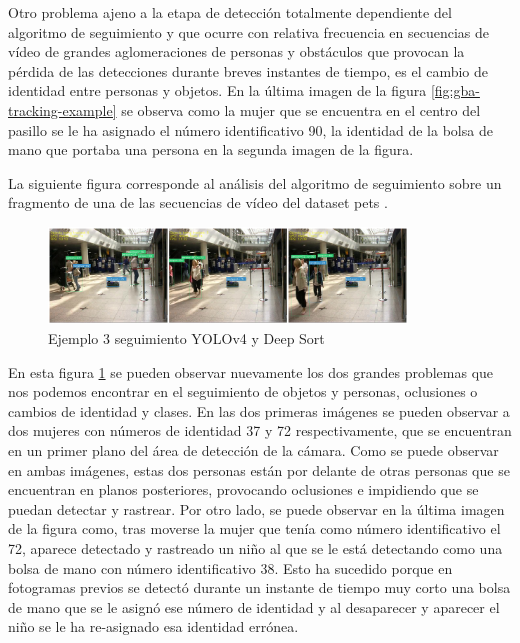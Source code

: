 Otro problema ajeno a la etapa de detección totalmente dependiente del algoritmo de seguimiento y que ocurre con relativa frecuencia en secuencias de vídeo de grandes aglomeraciones de personas y obstáculos que provocan la pérdida de las detecciones durante breves instantes de tiempo, es el cambio de identidad entre personas y objetos. En la última imagen de la figura \ref{fig:gba-tracking-example} se observa como la mujer que se encuentra en el centro del pasillo se le ha asignado el número identificativo 90, la identidad de la bolsa de mano que portaba una persona en la segunda imagen de la figura.

La siguiente figura corresponde al análisis del algoritmo de seguimiento sobre un fragmento de una de las secuencias de vídeo del dataset \gls{pets} \cite{pets2007-dataset}.

\begin{figure}[ht]
\centering
\includegraphics[width=0.85\textwidth]{img/chapters/resultados/tracking/pets-tracking-result-example.jpg}
\caption{\label{fig:pets2007-tracking-example}Ejemplo 3 seguimiento YOLOv4 y Deep Sort \cite{pets2007-dataset}}
\end{figure}

En esta figura \ref{fig:pets2007-tracking-example} se pueden observar nuevamente los dos grandes problemas que nos podemos encontrar en el seguimiento de objetos y personas, oclusiones o cambios de identidad y clases. En las dos primeras imágenes se pueden observar a dos mujeres con números de identidad 37 y 72 respectivamente, que se encuentran en un primer plano del área de detección de la cámara. Como se puede observar en ambas imágenes, estas dos personas están por delante de otras personas que se encuentran en planos posteriores, provocando oclusiones e impidiendo que se puedan detectar y rastrear. Por otro lado, se puede observar en la última imagen de la figura como, tras moverse la mujer que tenía como número identificativo el 72, aparece detectado y rastreado un niño al que se le está detectando como una bolsa de mano con número identificativo 38. Esto ha sucedido porque en fotogramas previos se detectó durante un instante de tiempo muy corto una bolsa de mano que se le asignó ese número de identidad y al desaparecer y aparecer el niño se le ha re-asignado esa identidad errónea.

